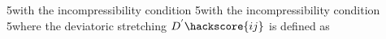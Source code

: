 
%
%
5with the incompressibility condition
%
%
%
%
5with the incompressibility condition
%
%
%
%
5where the deviatoric stretching $D^{'}\hackscore{ij}$ is defined as
%
%
